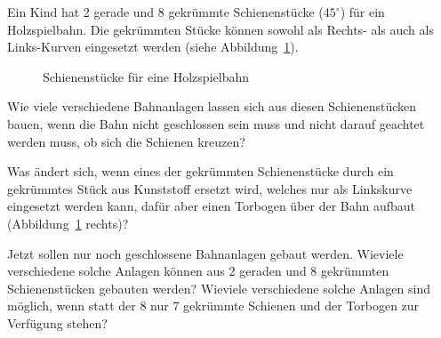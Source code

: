 Ein Kind hat 2 gerade und 8 gekrümmte Schienenstücke ($45^\circ$) für
ein Holzspielbahn.
Die gekrümmten Stücke können sowohl als Rechts- als auch als
Links-Kurven eingesetzt werden (siehe Abbildung~\ref{10000021:bild}).
\begin{figure}[h]
\centering
{}
\quad
{}
\caption{Schienenstücke für eine Holzspielbahn
\label{10000021:bild}}
\end{figure}


\begin{teilaufgaben}
\item
Wie viele verschiedene Bahnanlagen lassen sich aus diesen Schienenstücken
bauen, wenn die Bahn nicht geschlossen sein muss und nicht darauf geachtet
werden muss, ob sich die Schienen kreuzen?
\item
Was ändert sich, wenn eines der gekrümmten Schienenstücke durch ein
gekrümmtes Stück aus Kunststoff ersetzt wird, welches nur als Linkskurve
eingesetzt werden kann, dafür aber einen Torbogen über der Bahn aufbaut
(Abbildung~\ref{10000021:bild} rechts)?
\item
Jetzt sollen nur noch geschlossene Bahnanlagen gebaut werden.
Wieviele verschiedene solche Anlagen können aus 2 geraden und 8
gekrümmten Schienenstücken gebauten werden?
Wieviele verschiedene solche Anlagen sind möglich, wenn statt der
8 nur 7 gekrümmte Schienen und der Torbogen zur Verfügung stehen?
\end{teilaufgaben}

